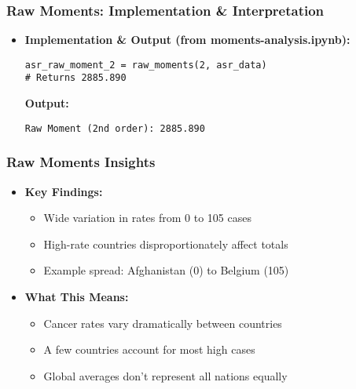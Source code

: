 \begin{frame}[fragile]
    \frametitle{Raw Moments: Implementation \& Interpretation}
    \begin{itemize}
        \item \textbf{Implementation \& Output (from moments-analysis.ipynb):}
              \begin{lstlisting}
asr_raw_moment_2 = raw_moments(2, asr_data) 
# Returns 2885.890
        \end{lstlisting}
              \textbf{Output:}
              \begin{verbatim}
Raw Moment (2nd order): 2885.890
        \end{verbatim}
    \end{itemize}
\end{frame}

\begin{frame}
    \frametitle{Raw Moments Insights}
    \begin{itemize}
        \item \textbf{Key Findings:}
        \begin{itemize}
            \item Wide variation in rates from 0 to 105 cases
            \item High-rate countries disproportionately affect totals
            \item Example spread: Afghanistan (0) to Belgium (105)
        \end{itemize}
        
        \item \textbf{What This Means:}
        \begin{itemize}
            \item Cancer rates vary dramatically between countries
            \item A few countries account for most high cases
            \item Global averages don't represent all nations equally
        \end{itemize}
    \end{itemize}
\end{frame}